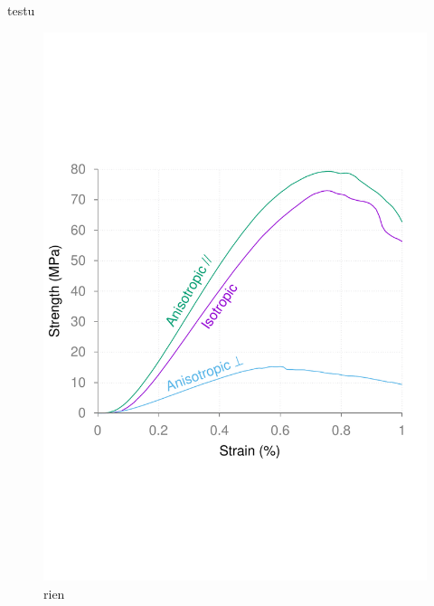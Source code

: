 \documentclass{article}
\begin{document}
	testu
	\begin{figure}[ht]
		\centering
		\includegraphics[width=\linewidth]{figures/sup_fig1.pdf}
		\caption{rien}
		\label{a}
	\end{figure}
\end{document}
